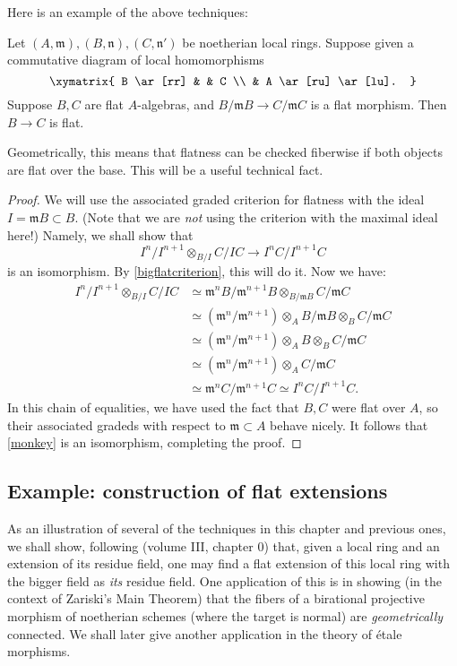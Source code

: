 Here is an example of the above techniques:
\begin{proposition} 
\label{fiberwiseflat}
Let $(A, \mathfrak{m}), (B, \mathfrak{n}), (C, \mathfrak{n}')$ be noetherian
local rings. Suppose given a commutative diagram of local homomorphisms
\[ \xymatrix{
B \ar[rr]  & & C \\
& A \ar[ru] \ar[lu].
}\]
Suppose $B, C$ are flat $A$-algebras, and $B/\mathfrak{m}B \to C/\mathfrak{m}C$
is a flat morphism. Then $B \to C$ is flat.
\end{proposition} 
Geometrically, this means that flatness can be checked fiberwise if both
objects are flat over the base.
This will be  a useful technical fact.
\begin{proof} 
We will use the associated graded criterion for flatness with the ideal
$I = \mathfrak{m}B \subset B$. (Note that we are \emph{not} using the criterion
with the maximal ideal here!) Namely, we shall show
that
\begin{equation} \label{monkey}  I^n/I^{n+1} \otimes_{B/I} C/IC \to I^n
C/I^{n+1}C \end{equation}
is an isomorphism. By \cref{bigflatcriterion}, this will do it. Now we have: 
\begin{align*}  
 I^n/I^{n+1} \otimes_{B/I} C/IC & \simeq 
\mathfrak{m}^nB/\mathfrak{m}^{n+1}B \otimes_{B/\mathfrak{m}B}
C/\mathfrak{m}C  \\ & \simeq
(\mathfrak{m}^n/\mathfrak{m}^{n+1})\otimes_{A} B/\mathfrak{m}B \otimes_B
C/\mathfrak{m}C  \\
& \simeq (\mathfrak{m}^n/\mathfrak{m}^{n+1})\otimes_{A} B \otimes_B
C/\mathfrak{m}C \\
& \simeq (\mathfrak{m}^n/\mathfrak{m}^{n+1})\otimes_{A} C/\mathfrak{m}C \\
& \simeq \mathfrak{m}^nC/\mathfrak{m}^{n+1} C \simeq I^n C/I^{n+1}C.
\end{align*}
In this chain of equalities, we have used the fact that $B, C$ were flat over
$A$, so their associated gradeds with respect to $\mathfrak{m} \subset A$
behave nicely. It follows that \eqref{monkey} is an isomorphism, completing the
proof.
\end{proof} 
\subsection{Example: construction of flat extensions}

As an illustration of several of the techniques in this chapter and previous
ones, we shall show, following \cite{EGA} (volume III, chapter 0) that, given a
local ring and an extension of its residue field, one may find a flat
extension of this local ring with the bigger field as \emph{its} residue
field. One application of this is in showing (in the context of Zariski's
Main Theorem) that the fibers of a birational
projective morphism of noetherian schemes (where the target is normal) are
\emph{geometrically} connected.
We shall later give another application in the theory of \'etale morphisms.

